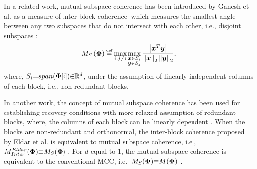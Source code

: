 In a related work, mutual subspace coherence has been introduced by Ganesh et al. as a measure of inter-block coherence, which measures the smallest angle between any two subspaces that do not intersect with each other, i.e., disjoint subspaces \cite{Ganesh2009}:
\begin{equation*}
\label{eq:MSubC} 
M_S\myparanthese{\myPhi} \myeq \displaystyle\max_{i,j \neq i} \displaystyle\max_{\substack{\boldsymbol{x} \in S_i \\ \boldsymbol{y} \in S_j}} \frac{\myabs{\boldsymbol{x}^T \boldsymbol{y}}}{\mynorm{\boldsymbol{x}}_2 \mynorm{\boldsymbol{y}}_2},
\end{equation*}
where, $S_i {=} span(\boldsymbol{\Phi}[i]) {\in} \mathbb{R}^{d}$, under the assumption of linearly independent columns of each block, i.e., non-redundant blocks.

In another work, the concept of mutual subspace coherence has been used for establishing recovery conditions with more relaxed assumption of redundant blocks, where, the columns of each block can be linearly dependent \cite{Elhamifar2011,Elhamifar2012b}.
When the blocks are non-redundant and orthonormal, the inter-block coherence proposed by Eldar et al. is equivalent to mutual subspace coherence, i.e., $M^{Eldar}_{Inter}(\boldsymbol{\Phi}) {\equiv} M_S(\boldsymbol{\Phi})$ \cite{Elhamifar2012b}.
For $d$ equal to $1$, the mutual subspace coherence is equivalent to the conventional MCC, i.e., $M_S(\boldsymbol{\Phi}) {\equiv} M(\boldsymbol{\Phi})$ \cite{Elhamifar2012b}.